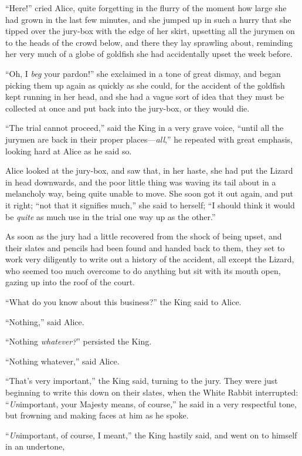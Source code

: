 \documentclass[book, 20pt]{extbook}
\begin{document}
``Here!'' cried Alice, quite forgetting in the flurry of the moment how
large she had grown in the last few minutes, and she jumped up in such a
hurry that she tipped over the jury-box with the edge of her skirt,
upsetting all the jurymen on to the heads of the crowd below, and there
they lay sprawling about, reminding her very much of a globe of goldfish
she had accidentally upset the week before.

``Oh, I \emph{beg} your pardon!'' she exclaimed in a tone of great
dismay, and began picking them up again as quickly as she could, for the
accident of the goldfish kept running in her head, and she had a vague
sort of idea that they must be collected at once and put back into the
jury-box, or they would die.

``The trial cannot proceed,'' said the King in a very grave voice,
``until all the jurymen are back in their proper places---\emph{all},''
he repeated with great emphasis, looking hard at Alice as he said so.

Alice looked at the jury-box, and saw that, in her haste, she had put
the Lizard in head downwards, and the poor little thing was waving its
tail about in a melancholy way, being quite unable to move. She soon got
it out again, and put it right; ``not that it signifies much,'' she said
to herself; ``I should think it would be \emph{quite} as much use in the
trial one way up as the other.''

As soon as the jury had a little recovered from the shock of being
upset, and their slates and pencils had been found and handed back to
them, they set to work very diligently to write out a history of the
accident, all except the Lizard, who seemed too much overcome to do
anything but sit with its mouth open, gazing up into the roof of the
court.

``What do you know about this business?'' the King said to Alice.

``Nothing,'' said Alice.

``Nothing \emph{whatever?}'' persisted the King.

``Nothing whatever,'' said Alice.

``That's very important,'' the King said, turning to the jury. They were
just beginning to write this down on their slates, when the White Rabbit
interrupted: ``\emph{Un}important, your Majesty means, of course,'' he
said in a very respectful tone, but frowning and making faces at him as
he spoke.

``\emph{Un}important, of course, I meant,'' the King hastily said, and
went on to himself in an undertone,
\end{document}
